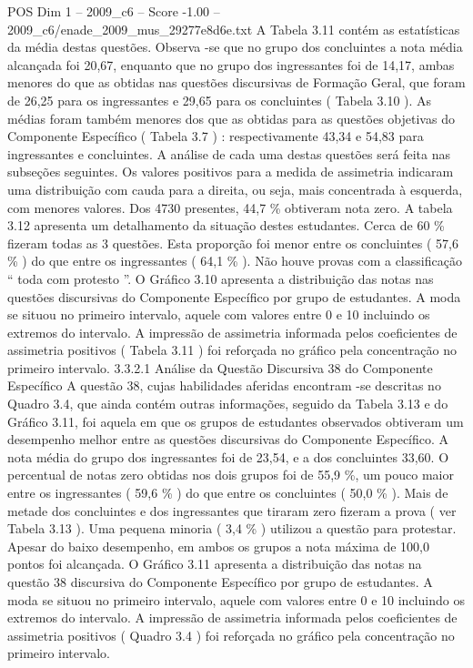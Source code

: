 \begin{textsample}{POS Dim 1 – 2009\_c6 – Score -1.00 – 2009\_c6/enade\_2009\_mus\_29277e8d6e.txt}
A Tabela 3.11 contém as estatísticas da média destas questões.
Observa -se que no grupo dos concluintes a nota média alcançada foi 20,67, enquanto que no grupo dos ingressantes foi de 14,17, ambas menores do que as obtidas nas questões discursivas de Formação Geral, que foram de 26,25 para os ingressantes e 29,65 para os concluintes ( Tabela 3.10 ).
As médias foram também menores dos que as obtidas para as questões objetivas do Componente Específico ( Tabela 3.7 ) : respectivamente 43,34 e 54,83 para ingressantes e concluintes.
A análise de cada uma destas questões será feita nas subseções seguintes.
Os valores positivos para a medida de assimetria indicaram uma distribuição com cauda para a direita, ou seja, mais concentrada à esquerda, com menores valores.
Dos 4730 presentes, 44,7 \% obtiveram nota zero.
A tabela 3.12 apresenta um detalhamento da situação destes estudantes.
Cerca de 60 \% fizeram todas as 3 questões.
Esta proporção foi menor entre os concluintes ( 57,6 \% ) do que entre os ingressantes ( 64,1 \% ).
Não houve provas com a classificação “ toda com protesto ”.
O Gráfico 3.10 apresenta a distribuição das notas nas questões discursivas do Componente Específico por grupo de estudantes.
A moda se situou no primeiro intervalo, aquele com valores entre 0 e 10 incluindo os extremos do intervalo.
A impressão de assimetria informada pelos coeficientes de assimetria positivos ( Tabela 3.11 ) foi reforçada no gráfico pela concentração no primeiro intervalo. 3.3.2.1 Análise da Questão Discursiva 38 do Componente Específico A questão 38, cujas habilidades aferidas encontram -se descritas no Quadro 3.4, que ainda contém outras informações, seguido da Tabela 3.13 e do Gráfico 3.11, foi aquela em que os grupos de estudantes observados obtiveram um desempenho melhor entre as questões discursivas do Componente Específico.
A nota média do grupo dos ingressantes foi de 23,54, e a dos concluintes 33,60.
O percentual de notas zero obtidas nos dois grupos foi de 55,9 \%, um pouco maior entre os ingressantes ( 59,6 \% ) do que entre os concluintes ( 50,0 \% ).
Mais de metade dos concluintes e dos ingressantes que tiraram zero fizeram a prova ( ver Tabela 3.13 ).
Uma pequena minoria ( 3,4 \% ) utilizou a questão para protestar.
Apesar do baixo desempenho, em ambos os grupos a nota máxima de 100,0 pontos foi alcançada.
O Gráfico 3.11 apresenta a distribuição das notas na questão 38 discursiva do Componente Específico por grupo de estudantes.
A moda se situou no primeiro intervalo, aquele com valores entre 0 e 10 incluindo os extremos do intervalo.
A impressão de assimetria informada pelos coeficientes de assimetria positivos ( Quadro 3.4 ) foi reforçada no gráfico pela concentração no primeiro intervalo.

\end{textsample}
